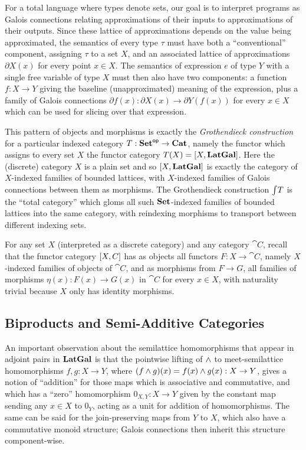 For a total language where types denote sets, our goal is to interpret programs as Galois connections relating
approximations of their inputs to approximations of their outputs. Since these lattice of approximations
depends on the value being approximated, the semantics of every type $\tau$ must have both a ``conventional''
component, assigning $\tau$ to a set $X$, and an associated lattice of approximations $\partial X(x)$ for
every point $x \in X$. The semantics of expression $e$ of type $Y$ with a single free variable of type $X$
must then also have two components: a function $f: X \to Y$ giving the baseline (unapproximated) meaning of
the expression, plus a family of Galois connections $\partial f(x): \partial X(x) \to \partial Y(f(x))$ for
every $x \in X$ which can be used for slicing over that expression.

This pattern of objects and morphisms is exactly the \emph{Grothendieck construction} for a particular indexed
category $T: \mathbf{Set}^{\mathsf{op}} \to \mathbf{Cat}$, namely the functor which assigns to every set $X$ the functor category $T(X)
= [X,\mathbf{LatGal}]$. Here the (discrete) category $X$ is a plain set and so $[X,\mathbf{LatGal}]$ is exactly
the category of $X$-indexed families of bounded lattices, with $X$-indexed families of Galois connections
between them as morphisms. The Grothendieck construction $\int_{}T$ is the ``total category'' which
gloms all such $\mathbf{Set}$-indexed families of bounded lattices into the same category, with reindexing morphisms
to transport between different indexing sets.

\begin{definition}
\label{def:fam:Fam}
For any set $X$ (interpreted as a discrete category) and any category $\cat{C}$, recall that the functor
category $[X,C]$ has as objects all functors $F: X \to \cat{C}$, namely $X$-indexed families of objects
of $\cat{C}$, and as morphisms from $F \to G$, all families of morphisms $\eta(x): F(x) \to G(x)$ in $\cat{C}$
for every $x \in X$, with naturality trivial because $X$ only has identity morphisms.
\end{definition}

\subsection{Biproducts and Semi-Additive Categories}

An important observation about the semilattice homomorphisms that appear in adjoint pairs in $\mathbf{LatGal}$ is that
the pointwise lifting of $\wedge$ to meet-semilattice homomorphisms $f, g: X \to Y$, where $(f \wedge g)(x) =
f(x) \wedge g(x): X \to Y$, gives a notion of ``addition'' for those maps which is associative and commutative,
and which has a ``zero'' homomorphism $0_{X,Y}: X \to Y$ given by the constant map sending any $x \in X$ to
$0_Y$, acting as a unit for addition of homomorphisms. The same can be said for the join-preserving maps from
$Y$ to $X$, which also have a commutative monoid structure; Galois connections then inherit this structure
component-wise.

